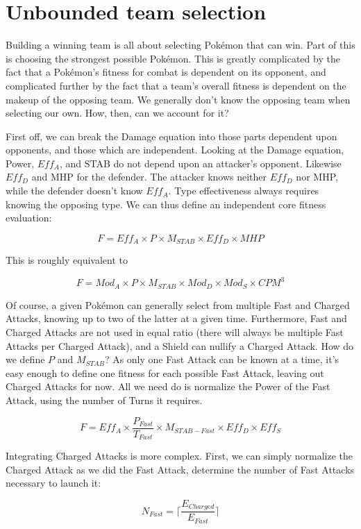 \chapter{Unbounded team selection}
\label{chap:unbounded}

Building a winning team is all about selecting Pokémon that can win.
Part of this is choosing the strongest possible Pokémon.
This is greatly complicated by the fact that a Pokémon's fitness for
 combat is dependent on its opponent, and complicated further by
 the fact that a team's overall fitness is dependent on the makeup
 of the opposing team.
We generally don't know the opposing team when selecting our own.
How, then, can we account for it?

First off, we can break the Damage equation into those parts dependent
 upon opponents, and those which are independent.
Looking at the Damage equation, Power, $Eff_A$, and STAB do not depend
 upon an attacker's opponent.
Likewise $Eff_D$ and MHP for the defender.
The attacker knows neither $Eff_D$ nor MHP, while the defender doesn't know $Eff_A$.
Type effectiveness always requires knowing the opposing type.
We can thus define an independent core fitness evaluation:

\[ F = Eff_A \times P \times M_{STAB} \times Eff_D \times MHP \]

This is roughly equivalent to

\[ F = Mod_A \times P \times M_{STAB} \times Mod_D \times Mod_S \times CPM^3 \]

Of course, a given Pokémon can generally select from multiple Fast and Charged Attacks,
  knowing up to two of the latter at a given time.
Furthermore, Fast and Charged Attacks are not used in equal ratio (there will
  always be multiple Fast Attacks per Charged Attack), and a Shield can
  nullify a Charged Attack.
How do we define $P$ and $M_{STAB}$?
As only one Fast Attack can be known at a time, it's easy enough to define one
  fitness for each possible Fast Attack, leaving out Charged Attacks for now.
All we need do is normalize the Power of the Fast Attack, using the number of
  Turns it requires.

\[ F = Eff_A \times \frac{P_{Fast}}{T_{Fast}} \times M_{STAB-Fast} \times Eff_D \times Eff_S \]

Integrating Charged Attacks is more complex.
First, we can simply normalize the Charged Attack as we did the Fast Attack,
 determine the number of Fast Attacks necessary to launch it:

\[ N_{Fast} = \lceil\frac{E_{Charged}}{E_{Fast}}\rceil \]

